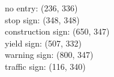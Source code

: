 no entry: (236, 336) \\
stop sign: (348, 348) \\
construction sign: (650, 347) \\
yield sign: (507, 332) \\
warning sign: (800, 347) \\
traffic sign: (116, 340) \\
